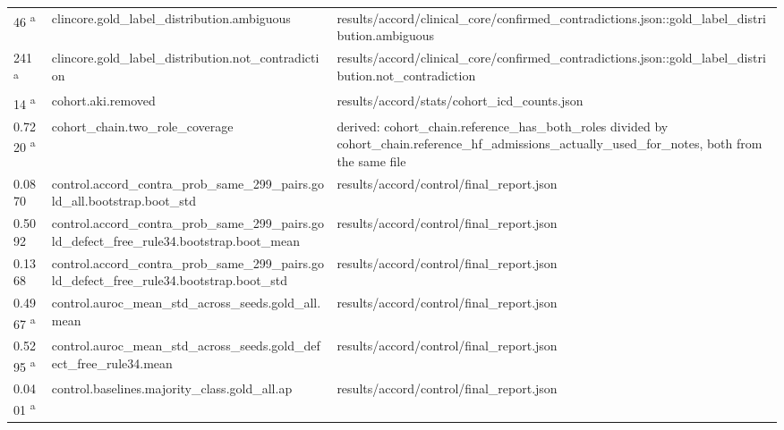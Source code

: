 \begin{longtable}{@{}p{0.7in}p{1.9in}p{2.6in}@{}}
46 \textsuperscript{a} & clincore.\allowbreak{}gold\_label\_distribution.\allowbreak{}ambiguous & results/\allowbreak{}accord/\allowbreak{}clinical\_core/\allowbreak{}confirmed\_contradictions.\allowbreak{}json::gold\_label\_distribution.\allowbreak{}ambiguous\\
241 \textsuperscript{a} & clincore.\allowbreak{}gold\_label\_distribution.\allowbreak{}not\_contradiction & results/\allowbreak{}accord/\allowbreak{}clinical\_core/\allowbreak{}confirmed\_contradictions.\allowbreak{}json::gold\_label\_distribution.\allowbreak{}not\_contradiction\\
14 \textsuperscript{a} & cohort.\allowbreak{}aki.\allowbreak{}removed & results/\allowbreak{}accord/\allowbreak{}stats/\allowbreak{}cohort\_icd\_counts.\allowbreak{}json\\
0.7220 \textsuperscript{a} & cohort\_chain.\allowbreak{}two\_role\_coverage & derived: cohort\_chain.\allowbreak{}reference\_has\_both\_roles divided by cohort\_chain.\allowbreak{}reference\_hf\_admissions\_actually\_used\_for\_notes, both from the same file\\
0.0870 & control.\allowbreak{}accord\_contra\_prob\_same\_299\_pairs.\allowbreak{}gold\_all.\allowbreak{}bootstrap.\allowbreak{}boot\_std & results/\allowbreak{}accord/\allowbreak{}control/\allowbreak{}final\_report.\allowbreak{}json\\
0.5092 & control.\allowbreak{}accord\_contra\_prob\_same\_299\_pairs.\allowbreak{}gold\_defect\_free\_rule34.\allowbreak{}bootstrap.\allowbreak{}boot\_mean & results/\allowbreak{}accord/\allowbreak{}control/\allowbreak{}final\_report.\allowbreak{}json\\
0.1368 & control.\allowbreak{}accord\_contra\_prob\_same\_299\_pairs.\allowbreak{}gold\_defect\_free\_rule34.\allowbreak{}bootstrap.\allowbreak{}boot\_std & results/\allowbreak{}accord/\allowbreak{}control/\allowbreak{}final\_report.\allowbreak{}json\\
0.4967 \textsuperscript{a} & control.\allowbreak{}auroc\_mean\_std\_across\_seeds.\allowbreak{}gold\_all.\allowbreak{}mean & results/\allowbreak{}accord/\allowbreak{}control/\allowbreak{}final\_report.\allowbreak{}json\\
0.5295 \textsuperscript{a} & control.\allowbreak{}auroc\_mean\_std\_across\_seeds.\allowbreak{}gold\_defect\_free\_rule34.\allowbreak{}mean & results/\allowbreak{}accord/\allowbreak{}control/\allowbreak{}final\_report.\allowbreak{}json\\
0.0401 \textsuperscript{a} & control.\allowbreak{}baselines.\allowbreak{}majority\_class.\allowbreak{}gold\_all.\allowbreak{}ap & results/\allowbreak{}accord/\allowbreak{}control/\allowbreak{}final\_report.\allowbreak{}json\\

\end{longtable}
